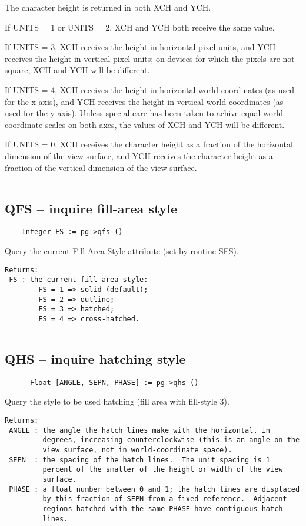 The character height is returned in both XCH and YCH.

If UNITS = 1 or UNITS = 2, XCH and YCH both receive the same value.

If UNITS = 3, XCH receives the height in horizontal pixel units, and
YCH receives the height in vertical pixel units; on devices for which
the pixels are not square, XCH and YCH will be different.

If UNITS = 4, XCH receives the height in horizontal world coordinates
(as used for the x-axis), and YCH receives the height in vertical
world coordinates (as used for the y-axis).  Unless special care has
been taken to achive equal world-coordinate scales on both axes, the
values of XCH and YCH will be different.

If UNITS = 0, XCH receives the character height as a fraction of the
horizontal dimension of the view surface, and YCH receives the
character height as a fraction of the vertical dimension of the view
surface.

\hrule

\subsection*{QFS -- inquire fill-area style }

\begin{verbatim}
    Integer FS := pg->qfs ()
\end{verbatim}

Query the current Fill-Area Style attribute (set by routine SFS).

\begin{verbatim}
Returns:
 FS : the current fill-area style:
        FS = 1 => solid (default);
        FS = 2 => outline;
        FS = 3 => hatched;
        FS = 4 => cross-hatched.
\end{verbatim}

\hrule

\subsection*{QHS -- inquire hatching style }

\begin{verbatim}
      Float [ANGLE, SEPN, PHASE] := pg->qhs ()
\end{verbatim}

Query the style to be used hatching (fill area with fill-style 3).

\begin{verbatim}
Returns:
 ANGLE : the angle the hatch lines make with the horizontal, in
         degrees, increasing counterclockwise (this is an angle on the
         view surface, not in world-coordinate space). 
 SEPN  : the spacing of the hatch lines.  The unit spacing is 1
         percent of the smaller of the height or width of the view
         surface. 
 PHASE : a float number between 0 and 1; the hatch lines are displaced
         by this fraction of SEPN from a fixed reference.  Adjacent
         regions hatched with the same PHASE have contiguous hatch
         lines. 
\end{verbatim}


